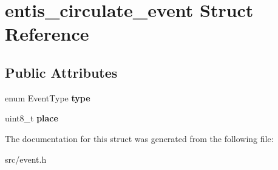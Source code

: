 \hypertarget{structentis__circulate__event}{}\section{entis\+\_\+circulate\+\_\+event Struct Reference}
\label{structentis__circulate__event}
\subsection*{Public Attributes}
\begin{DoxyCompactItemize}
\item 
\mbox{\label{structentis__circulate__event_a1b5fb9a18d7d078b91bc2d84d1a79f4f}} 
enum Event\+Type {\bfseries type}
\item 
\mbox{\label{structentis__circulate__event_a734494f1caddbdea910629db8970038c}} 
uint8\+\_\+t {\bfseries place}
\end{DoxyCompactItemize}


The documentation for this struct was generated from the following file\+:\begin{DoxyCompactItemize}
\item 
src/event.\+h\end{DoxyCompactItemize}
